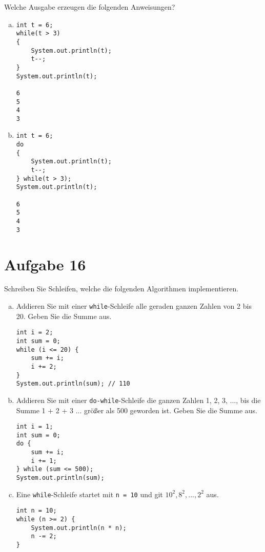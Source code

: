 \documentclass[10pt, oneside]{article}
\begin{document}
Welche Ausgabe erzeugen die folgenden Anweisungen?

\begin{enumerate}[(a)]
\item
\begin{verbatim}
int t = 6;
while(t > 3)
{
    System.out.println(t);
    t--;
}
System.out.println(t);

6
5
4
3
\end{verbatim}

\pagebreak
\item
\begin{verbatim}
int t = 6;
do
{
    System.out.println(t);
    t--;
} while(t > 3);
System.out.println(t);

6
5
4
3
\end{verbatim}
\end{enumerate}

\section{Aufgabe 16}

Schreiben Sie Schleifen, welche die folgenden Algorithmen implementieren.

\begin{enumerate}[(a)]
\item Addieren Sie mit einer \verb|while|-Schleife alle geraden ganzen Zahlen von 2 bis 20.
    Geben Sie die Summe aus.

\begin{verbatim}
int i = 2;
int sum = 0;
while (i <= 20) {
    sum += i;
    i += 2;
}
System.out.println(sum); // 110
\end{verbatim}

\item Addieren Sie mit einer \verb|do-while|-Schleife die ganzen Zahlen 1, 2, 3, ...,
    bis die Summe 1 + 2 + 3 ... größer als 500 geworden ist. Geben Sie die
    Summe aus.

\begin{verbatim}
int i = 1;
int sum = 0;
do {
    sum += i;
    i += 1;
} while (sum <= 500);
System.out.println(sum);
\end{verbatim}

\item Eine \verb|while|-Schleife startet mit \verb|n = 10| und git $10^2, 8^2, ...,  2^2$ aus.

\begin{verbatim}
int n = 10;
while (n >= 2) {
    System.out.println(n * n);
    n -= 2;
}
\end{verbatim}

\end{enumerate}
\end{document}
